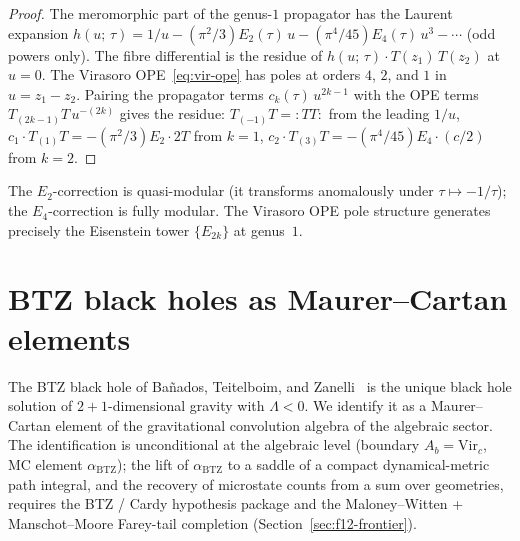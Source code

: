 \documentclass[11pt,reqno]{amsart}
\theoremstyle{definition}
\theoremstyle{remark}
\providecommand{\Vir}{\mathrm{Vir}}
\begin{document}
\begin{proof}
The meromorphic part of the genus-$1$ propagator has the Laurent
expansion $h(u;\,\tau) = 1/u - (\pi^2/3)E_2(\tau)\,u
- (\pi^4/45)E_4(\tau)\,u^3 - \cdots$ (odd powers only).
The fibre differential is the residue of $h(u;\,\tau) \cdot
T(z_1)\,T(z_2)$ at $u = 0$. The Virasoro OPE~\eqref{eq:vir-ope}
has poles at orders $4$, $2$, and $1$ in $u = z_1 - z_2$.
Pairing the propagator terms $c_k(\tau)\,u^{2k-1}$ with the
OPE terms $T_{(2k-1)}T\,u^{-(2k)}$ gives the residue:
$T_{(-1)}T = {:}TT{:}$ from the leading $1/u$,
$c_1 \cdot T_{(1)}T = -(\pi^2/3)E_2 \cdot 2T$ from $k=1$,
$c_2 \cdot T_{(3)}T = -(\pi^4/45)E_4 \cdot (c/2)$ from $k=2$.
\end{proof}

The $E_2$-correction is quasi-modular (it transforms anomalously
under $\tau \mapsto -1/\tau$); the $E_4$-correction is fully
modular. The Virasoro OPE pole structure generates precisely the
Eisenstein tower $\{E_{2k}\}$ at genus~$1$.

\section{BTZ black holes as Maurer--Cartan elements}
\label{sec:btz}

The BTZ black hole of Ba\~{n}ados, Teitelboim, and
Zanelli~\cite{BTZ92} is the unique black hole solution of
$2{+}1$-dimensional gravity with $\Lambda < 0$. We identify it as a
Maurer--Cartan element of the gravitational convolution algebra of
the algebraic sector. The identification is unconditional at the
algebraic level (boundary $A_b = \Vir_c$, MC element
$\alpha_{\mathrm{BTZ}}$); the lift of $\alpha_{\mathrm{BTZ}}$ to a
saddle of a compact dynamical-metric path integral, and the
recovery of microstate counts from a sum over geometries, requires
the BTZ / Cardy hypothesis package and the Maloney--Witten +
Manschot--Moore Farey-tail completion (Section~\ref{sec:f12-frontier}).
\end{document}

